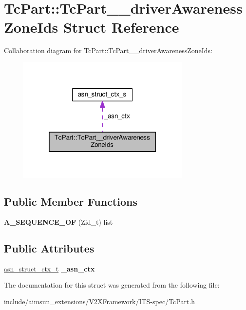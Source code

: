 \hypertarget{structTcPart_1_1TcPart____driverAwarenessZoneIds}{}\section{Tc\+Part\+:\+:Tc\+Part\+\_\+\+\_\+driver\+Awareness\+Zone\+Ids Struct Reference}
\label{structTcPart_1_1TcPart____driverAwarenessZoneIds}


Collaboration diagram for Tc\+Part\+:\+:Tc\+Part\+\_\+\+\_\+driver\+Awareness\+Zone\+Ids\+:\nopagebreak
\begin{figure}[H]
\begin{center}
\leavevmode
\includegraphics[width=244pt]{structTcPart_1_1TcPart____driverAwarenessZoneIds__coll__graph}
\end{center}
\end{figure}
\subsection*{Public Member Functions}
\begin{DoxyCompactItemize}
\item 
{\bfseries A\+\_\+\+S\+E\+Q\+U\+E\+N\+C\+E\+\_\+\+OF} (Zid\+\_\+t) list\hypertarget{structTcPart_1_1TcPart____driverAwarenessZoneIds_a6f304256c1817b6f26918e33d223a06b}{}\label{structTcPart_1_1TcPart____driverAwarenessZoneIds_a6f304256c1817b6f26918e33d223a06b}

\end{DoxyCompactItemize}
\subsection*{Public Attributes}
\begin{DoxyCompactItemize}
\item 
\hyperlink{structasn__struct__ctx__s}{asn\+\_\+struct\+\_\+ctx\+\_\+t} {\bfseries \+\_\+asn\+\_\+ctx}\hypertarget{structTcPart_1_1TcPart____driverAwarenessZoneIds_ac2d1c50a458e6b956f4df556f9e25896}{}\label{structTcPart_1_1TcPart____driverAwarenessZoneIds_ac2d1c50a458e6b956f4df556f9e25896}

\end{DoxyCompactItemize}


The documentation for this struct was generated from the following file\+:\begin{DoxyCompactItemize}
\item 
include/aimsun\+\_\+extensions/\+V2\+X\+Framework/\+I\+T\+S-\/spec/Tc\+Part.\+h\end{DoxyCompactItemize}
